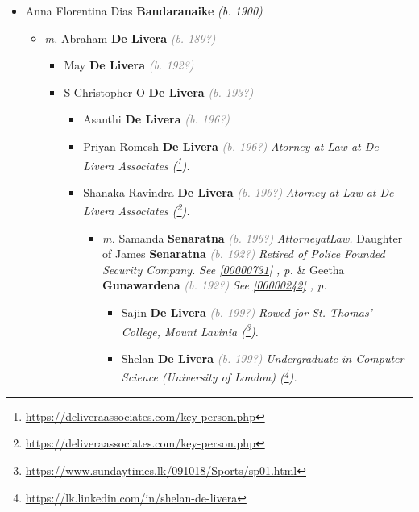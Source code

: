 \documentclass[10pt, openany]{book}
\begin{document}
\begin{itemize}
{\begin{itemize}
{\begin{itemize}
\end{itemize}
    }
\item{Anna Florentina Dias \textbf{Bandaranaike} \textcolor{slorange}{\textit{(b. 1900)}}
\begin{itemize}
\item{\textit{m.} Abraham \textbf{De Livera} \textcolor{gray}{\textit{(b. 189?)}}   \label{couple:00001538:00001539} \begin{itemize}
\item{May \textbf{De Livera} \textcolor{gray}{\textit{(b. 192?)}}
  }
\item{S Christopher O \textbf{De Livera} \textcolor{gray}{\textit{(b. 193?)}}
\begin{itemize}
\item{Asanthi \textbf{De Livera} \textcolor{gray}{\textit{(b. 196?)}}
  }
\item{Priyan Romesh \textbf{De Livera} \textcolor{gray}{\textit{(b. 196?)}} \textcolor{slmaroon}{\textit{Atorney-at-Law at De Livera Associates (\footnote{\url{https://deliveraassociates.com/key-person.php}}).}}
   }
\item{Shanaka Ravindra \textbf{De Livera} \textcolor{gray}{\textit{(b. 196?)}} \textcolor{slmaroon}{\textit{Atorney-at-Law at De Livera Associates (\footnote{\url{https://deliveraassociates.com/key-person.php}}).}}
\begin{itemize}
\item{\textit{m.} Samanda \textbf{Senaratna} \textcolor{gray}{\textit{(b. 196?)}} \textcolor{slmaroon}{\textit{AttorneyatLaw.}} Daughter of  James  \textbf{Senaratna} \textcolor{gray}{\textit{(b. 192?)}} \textcolor{slmaroon}{\textit{Retired of Police Founded Security Company.}} \textcolor{slteal}{\textit{See  \autoref{00000731} \textit{, p. \pageref{00000731} }}}  \&  Geetha \textbf{Gunawardena} \textcolor{gray}{\textit{(b. 192?)}} \textcolor{slteal}{\textit{See  \autoref{00000242} \textit{, p. \pageref{00000242} }}}   \label{couple:00000139:00000772} \begin{itemize}
\item{Sajin \textbf{De Livera} \textcolor{gray}{\textit{(b. 199?)}} \textcolor{slmaroon}{\textit{Rowed for St. Thomas' College, Mount Lavinia (\footnote{\url{https://www.sundaytimes.lk/091018/Sports/sp01.html}}).}}
  }
\item{Shelan \textbf{De Livera} \textcolor{gray}{\textit{(b. 199?)}} \textcolor{slmaroon}{\textit{Undergraduate in Computer Science (University of London) (\footnote{\url{https://lk.linkedin.com/in/shelan-de-livera}}).}}
}
\end{itemize}}
\end{itemize}}
\end{itemize}}
\end{itemize}}
\end{itemize}}
\end{itemize}}
\end{itemize}
\end{document}

